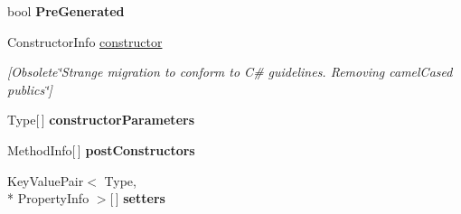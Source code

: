 \begin{DoxyCompactItemize}
\item 
\hypertarget{classstrange_1_1extensions_1_1reflector_1_1impl_1_1_reflected_class_a10848400ecfbe1a4032d200b2fefe1c4}{bool {\bfseries Pre\-Generated}}\label{classstrange_1_1extensions_1_1reflector_1_1impl_1_1_reflected_class_a10848400ecfbe1a4032d200b2fefe1c4}

\item 
\hypertarget{classstrange_1_1extensions_1_1reflector_1_1impl_1_1_reflected_class_ab416b63088916c708099e233cddf38c4}{Constructor\-Info \hyperlink{classstrange_1_1extensions_1_1reflector_1_1impl_1_1_reflected_class_ab416b63088916c708099e233cddf38c4}{constructor}}\label{classstrange_1_1extensions_1_1reflector_1_1impl_1_1_reflected_class_ab416b63088916c708099e233cddf38c4}

\begin{DoxyCompactList}\small\item\em \mbox{[}Obsolete\char`\"{}\-Strange migration to conform to C\# guidelines. Removing camel\-Cased publics\char`\"{}\mbox{]} \end{DoxyCompactList}\item 
\hypertarget{classstrange_1_1extensions_1_1reflector_1_1impl_1_1_reflected_class_a13a7d8025cde8512475ca2653cb4a3dc}{Type\mbox{[}$\,$\mbox{]} {\bfseries constructor\-Parameters}}\label{classstrange_1_1extensions_1_1reflector_1_1impl_1_1_reflected_class_a13a7d8025cde8512475ca2653cb4a3dc}

\item 
\hypertarget{classstrange_1_1extensions_1_1reflector_1_1impl_1_1_reflected_class_a88ef38bdca111c1e9ae8559ccd92f1c4}{Method\-Info\mbox{[}$\,$\mbox{]} {\bfseries post\-Constructors}}\label{classstrange_1_1extensions_1_1reflector_1_1impl_1_1_reflected_class_a88ef38bdca111c1e9ae8559ccd92f1c4}

\item 
\hypertarget{classstrange_1_1extensions_1_1reflector_1_1impl_1_1_reflected_class_a09f39ddb3849b00dfb5ed1b61924a435}{Key\-Value\-Pair$<$ Type, \\*
Property\-Info $>$\mbox{[}$\,$\mbox{]} {\bfseries setters}}\label{classstrange_1_1extensions_1_1reflector_1_1impl_1_1_reflected_class_a09f39ddb3849b00dfb5ed1b61924a435}


\end{DoxyCompactItemize}
